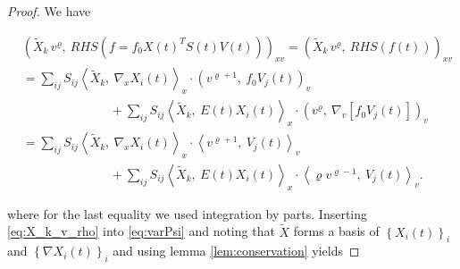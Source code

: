 \begin{proof}
    We have 

    \begin{equation}\label{eq:X_k_v_rho}
        \begin{split}
            &\left( 
                \widetilde{ X }_k \,v^\varrho,\ RHS ( f = f_0 X(t)^T S(t) V(t) )
            \right)_{x v} 
            = \left( 
                \widetilde{ X }_k \,v^\varrho,\ RHS ( f(t) )
            \right)_{x v} \\
            &= \sum_{i j} S_{i j} 
                \left\langle \widetilde{ X }_k,\ \nabla_x X_i (t) \right\rangle_x \cdot 
                \left( v^{\varrho + 1},\ f_0 V_j (t) \right)_v \\ 
                &\quad\quad\quad\quad\quad\quad\quad%
                + \sum_{i j} S_{i j} 
                \left\langle \widetilde{ X }_k,\ E(t) X_i (t) \right\rangle_x \cdot 
                \left( v^\varrho,\ \nabla_v \left[ f_0 V_j (t) \right] \right)_v \\ 
            &= \sum_{i j} S_{i j} 
                \left\langle \widetilde{ X }_k,\ \nabla_x X_i (t) \right\rangle_x \cdot 
                \left\langle v^{\varrho + 1},\ V_j (t) \right\rangle_v \\ 
                &\quad\quad\quad\quad\quad\quad\quad%
                + \sum_{i j} S_{i j} 
                \left\langle \widetilde{ X }_k,\ E(t) X_i (t) \right\rangle_x \cdot 
                \left\langle \varrho v^{\varrho - 1},\ V_j (t) \right\rangle_v . 
        \end{split}
    \end{equation}

    where for the last equality we used integration by parts. 
    Inserting \ref{eq:X_k_v_rho} into \ref{eq:varPsi} and noting that $\widetilde{ X }$ 
    forms a basis of $\left\{ X_i (t) \right\}_i$ and $\left\{ \nabla X_i (t) \right\}_i$ 
    and using lemma \ref{lem:conservation} yields 


\end{proof}
